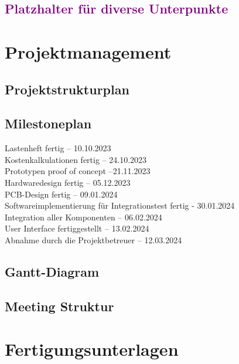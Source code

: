 \documentclass[11pt]{article}
\begin{document}
\subsection{\textcolor{purple}{Platzhalter für diverse Unterpunkte}}

\section{Projektmanagement}
\subsection{Projektstrukturplan}
\subsection{Milestoneplan}
Lastenheft fertig – 10.10.2023 \\
Kostenkalkulationen fertig – 24.10.2023 \\
Prototypen proof of concept –21.11.2023 \\
Hardwaredesign fertig – 05.12.2023 \\
PCB-Design fertig – 09.01.2024 \\
Softwareimplementierung für Integrationstest fertig - 30.01.2024 \\
Integration aller Komponenten – 06.02.2024 \\
User Interface fertiggestellt – 13.02.2024 \\
Abnahme durch die Projektbetreuer – 12.03.2024

\subsection{Gantt-Diagram}
\subsection{Meeting Struktur}

\section{Fertigungsunterlagen}
\end{document}
